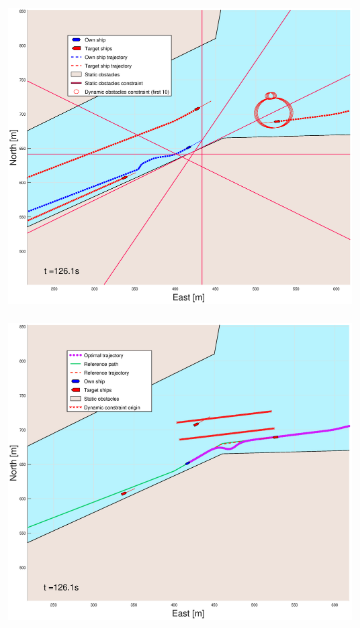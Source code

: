 \begin{figure}[!b]
\begin{subfigure}[b]{0.499\textwidth}
    \end{subfigure}
    \hfill
    \\
    \begin{subfigure}[b]{0.49\textwidth}
        \centering
        \includegraphics[width=\textwidth]{Images/Figures/Trheimfjord/_Simple_1fig1_time=126}
    \end{subfigure}
    \hfill
    \begin{subfigure}[b]{0.499\textwidth}
        \centering
        \includegraphics[width=\textwidth]{Images/Figures/Trheimfjord/_Simple_1fig999_time=126}

\end{subfigure}
\end{figure}
